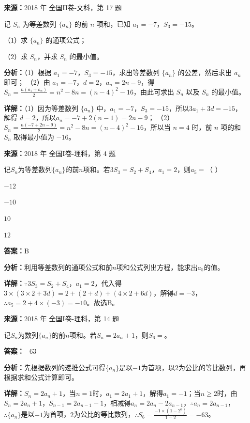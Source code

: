 \begin{question}[points=12]
\textbf{来源：}2018 年 全国II卷-文科，第 17 题\par
记 $S_n$ 为等差数列 $\{a_n\}$ 的前 $n$ 项和，已知 $a_1=-7$，$S_3=-15$。

（1）求 $\{a_n\}$ 的通项公式；

（2）求 $S_n$，并求 $S_n$ 的最小值。
\begin{solution}

\textbf{分析：}（1）根据 $a_1=-7$，$S_3=-15$，求出等差数列 $\{a_n\}$ 的公差，然后求出 $a_n$ 即可；
（2）由 $a_1=-7$，$d=2$，$a_n=2n-9$，得 $S_n=\frac{n(a_1+a_n)}{2}=n^2-8n=(n-4)^2-16$，由此可求出 $S_n$ 以及 $S_n$ 的最小值。

\textbf{详解：}（1）因为等差数列 $\{a_n\}$ 中，$a_1=-7$，$S_3=-15$，所以$3a_1+3d=-15$，解得 $d=2$，所以$a_n=-7+2(n-1)=2n-9$；
（2）$S_n=\frac{n(-7+2n-9)}{2}=n^2-8n=(n-4)^2-16$，所以当 $n=4$ 时，前 $n$ 项的和 $S_n$ 取得最小值为 $-16$。
\end{solution}
\end{question}

\begin{question}[points=5]
\textbf{来源：}2018 年 全国I卷-理科，第 4 题\par
记$S_n$为等差数列$\{a_n\}$的前$n$项和。若$3S_3=S_2+S_4$，$a_1=2$，则$a_5=$（    ）
\begin{choices}
  \item $-12$
  \item $-10$
  \item $10$
  \item $12$
\end{choices}
\begin{solution}
\textbf{答案：}B

\textbf{分析：}利用等差数列的通项公式和前$n$项和公式列出方程，能求出$a_5$的值。

\textbf{详解：}$\because 3S_3=S_2+S_4$，$a_1=2$，代入得$3\times(3\times2+3d)=2+(2+d)+(4\times2+6d)$，解得$d=-3$，$\therefore a_5=2+4\times(-3)=-10$。故选B。
\end{solution}
\end{question}

\begin{question}[points=5]
\textbf{来源：}2018 年 全国I卷-理科，第 14 题\par
记$S_n$为数列$\{a_n\}$的前$n$项和。若$S_n=2a_n+1$，则$S_6=$。
\fillin[{$-63$}]
\begin{solution}
\textbf{答案：}$-63$

\textbf{分析：}先根据数列的递推公式可得$\{a_n\}$是以$-1$为首项，以$2$为公比的等比数列，再根据求和公式计算即可。

\textbf{详解：}$S_n=2a_n+1$，当$n=1$时，$a_1=2a_1+1$，解得$a_1=-1$；当$n\geq2$时，由$S_n=2a_n+1$，$S_{n-1}=2a_{n-1}+1$，相减得$a_n=2a_n-2a_{n-1}$，$\therefore a_n=2a_{n-1}$，$\therefore \{a_n\}$是以$-1$为首项，$2$为公比的等比数列，$\therefore S_6=\frac{-1\times(1-2^6)}{1-2}=-63$。
\end{solution}
\end{question}

